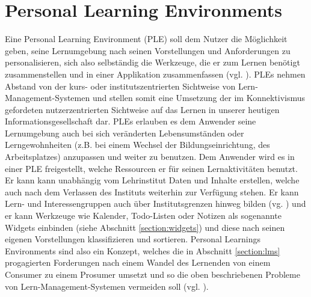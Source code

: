 \section{Personal Learning Environments}\label{section:ple_intro}
Eine Personal Learning Environment (PLE) soll dem Nutzer die Möglichkeit geben, seine Lernumgebung nach seinen Vorstellungen und Anforderungen zu personalisieren, sich also selbständig die Werkzeuge, die er zum Lernen benötigt zusammenstellen und in einer Applikation zusammenfassen (vgl. \cite{VanHarmelen}). PLEs nehmen Abstand von der kurs- oder institutszentrierten Sichtweise von Lern-Management-Systemen und stellen somit eine Umsetzung der im Konnektivismus gefordeten nutzerzentrierten Sichtweise auf das Lernen in unserer heutigen Informationsgesellschaft dar. PLEs erlauben es dem Anwender seine Lernumgebung auch bei sich veränderten Lebensumständen oder Lerngewohnheiten (z.B. bei einem Wechsel der Bildungseinrichtung, des Arbeitsplatzes) anzupassen und weiter zu benutzen. Dem Anwender wird es in einer PLE freigestellt, welche Ressourcen er für seinen Lernaktivitäten benutzt. Er kann kann unabhängig vom Lehrinstitut Daten und Inhalte erstellen, welche auch nach dem Verlassen des Instituts weiterhin zur Verfügung stehen. Er kann Lern- und Interessengruppen auch über Institutsgrenzen hinweg bilden (vg. \cite{Schaffert2008a}) und er kann Werkzeuge wie Kalender, Todo-Listen oder Notizen als sogenannte Widgets einbinden (siehe Abschnitt \ref{section:widgets}) und diese nach seinen eigenen Vorstellungen klassifizieren und sortieren. Personal Learnings Environments sind also ein Konzept, welches die in Abschnitt \ref{section:lms} progagierten Forderungen nach einem Wandel des Lernenden von einem Consumer zu einem Prosumer umsetzt und so die oben beschriebenen Probleme von Lern-Management-Systemen vermeiden soll (vgl. \cite{Attwell2007}).

